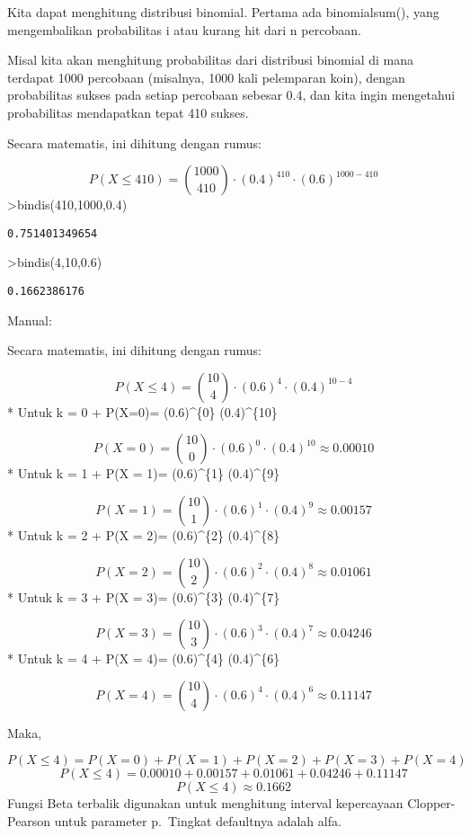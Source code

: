 \documentclass[
]{book}
\begin{document}
Kita dapat menghitung distribusi binomial. Pertama ada binomialsum(), yang mengembalikan probabilitas i atau kurang hit dari n percobaan.

Misal kita akan menghitung probabilitas dari distribusi binomial di mana terdapat 1000 percobaan (misalnya, 1000 kali pelemparan koin), dengan probabilitas sukses pada setiap percobaan sebesar 0.4, dan kita ingin mengetahui probabilitas mendapatkan tepat 410 sukses.

Secara matematis, ini dihitung dengan rumus:

\[P(X \leq 410)= \binom{1000}{410} \cdot (0.4)^{410} \cdot (0.6)^{1000-410}\]\textgreater bindis(410,1000,0.4)

\begin{verbatim}
0.751401349654
\end{verbatim}

\textgreater bindis(4,10,0.6)

\begin{verbatim}
0.1662386176
\end{verbatim}

Manual:

Secara matematis, ini dihitung dengan rumus:

\[P(X \leq 4)= \binom{10}{4} \cdot (0.6)^{4} \cdot (0.4)^{10-4}\]* Untuk k = 0 + P(X=0)=  \cdot (0.6)\^{}\{0\} \cdot (0.4)\^{}\{10\} 

\[P(X=0)= \binom{10}{0} \cdot (0.6)^{0} \cdot (0.4)^{10} \approx 0.00010\]* Untuk k = 1 + P(X = 1)=  \cdot (0.6)\^{}\{1\} \cdot (0.4)\^{}\{9\} 

\[P(X = 1)= \binom{10}{1} \cdot (0.6)^{1} \cdot (0.4)^{9} \approx 0.00157\]* Untuk k = 2 + P(X = 2)=  \cdot (0.6)\^{}\{2\} \cdot (0.4)\^{}\{8\} 

\[P(X = 2)= \binom{10}{2} \cdot (0.6)^{2} \cdot (0.4)^{8} \approx 0.01061\]* Untuk k = 3 + P(X = 3)=  \cdot (0.6)\^{}\{3\} \cdot (0.4)\^{}\{7\} 

\[P(X = 3)= \binom{10}{3} \cdot (0.6)^{3} \cdot (0.4)^{7} \approx 0.04246\]* Untuk k = 4 + P(X = 4)=  \cdot (0.6)\^{}\{4\} \cdot (0.4)\^{}\{6\} 

\[P(X = 4)= \binom{10}{4} \cdot (0.6)^{4} \cdot (0.4)^{6} \approx 0.11147\]

Maka,

\[P(X \leq 4)= P(X=0)+P(X=1)+P(X=2)+P(X=3)+P(X=4)\] \[P(X \leq 4)= 0.00010 + 0.00157 + 0.01061+ 0.04246+ 0.11147\] \[P(X \leq 4)\approx 0.1662\]Fungsi Beta terbalik digunakan untuk menghitung interval kepercayaan Clopper-Pearson untuk parameter p.~Tingkat defaultnya adalah alfa.
\end{document}

